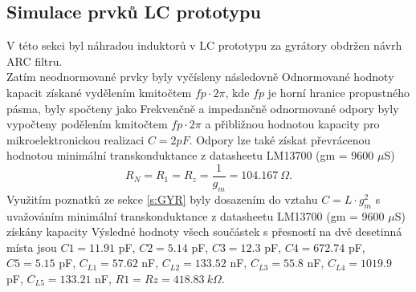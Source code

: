 \subsection{Simulace prvků LC prototypu}\label{s:ARC}
V této sekci byl náhradou induktorů v LC prototypu za gyrátory obdržen návrh ARC filtru.\\
Zatím neodnormované prvky byly vyčísleny následovně
\noindent Odnormované hodnoty kapacit získané vydělením kmitočtem $fp \cdot 2 \pi$, kde $fp$ je horní hranice propustného pásma, byly spočteny jako
\noindent Frekvenčně a impedančně odnormované odpory byly vypočteny podělením kmitočtem $fp \cdot 2 \pi$ a přibližnou hodnotou kapacity pro mikroelektronickou realizaci $C = 2 pF$.
\noindent Odpory lze také získat převrácenou hodnotou minimální transkonduktance z datasheetu LM13700 (gm = 9600 $\mu$S)
\begin{equation}
R_N = R_1 = R_z = \frac{1}{g_m} = 104.167 \ \Omega.
\end{equation}
\noindent Využitím poznatků ze sekce \ref{s:GYR} byly dosazením do vztahu $C = L \cdot g_m^2$ s uvažováním minimální transkonduktance z datasheetu LM13700 (gm = 9600 $\mu$S) získány kapacity 
\noindent Výsledné hodnoty všech součástek s přesností na dvě desetinná místa jsou $C1 = 11.91$ pF, $C2 = 5.14$ pF, $C3 = 12.3$ pF, $C4 = 672.74$ pF, $C5 = 5.15$ pF, $C_{L1} = 57.62 $ nF, $C_{L2} = 133.52$ nF, $C_{L3} = 55.8$ nF, $C_{L4} = 1019.9$ pF, $C_{L5} = 133.21$ nF, $R1 = Rz = 418.83\ k\Omega$.
